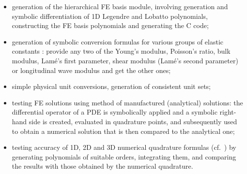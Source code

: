 \begin{itemize}
\item generation of the hierarchical FE basis module, involving generation and
  symbolic differentiation of 1D Legendre and Lobatto polynomials, constructing
  the FE basis polynomials \cite{Solin2003hpfem} and generating the C code;
\item generation of symbolic conversion formulas for various groups of elastic
  constants \cite{Fung1993contmech}:  provide any two of the Young's modulus,
  Poisson's ratio, bulk modulus, Lam\'{e}'s first parameter, shear modulus
  (Lam\'{e}'s second parameter) or longitudinal wave modulus and get the other
  ones;
\item simple physical unit conversions, generation of consistent unit sets;
\item testing FE solutions using method of manufactured (analytical)
  solutions:  the differential operator of a PDE is symbolically applied and a symbolic
  right-hand side is created, evaluated in quadrature points, and subsequently
  used to obtain a numerical solution that is then compared to the analytical
  one;
\item testing accuracy of 1D, 2D and 3D numerical quadrature formulas
  (cf.~\cite{Abramowitz1964handbook}) by generating polynomials of suitable
  orders, integrating them, and comparing the results with those obtained by
  the numerical quadrature.
\end{itemize}
